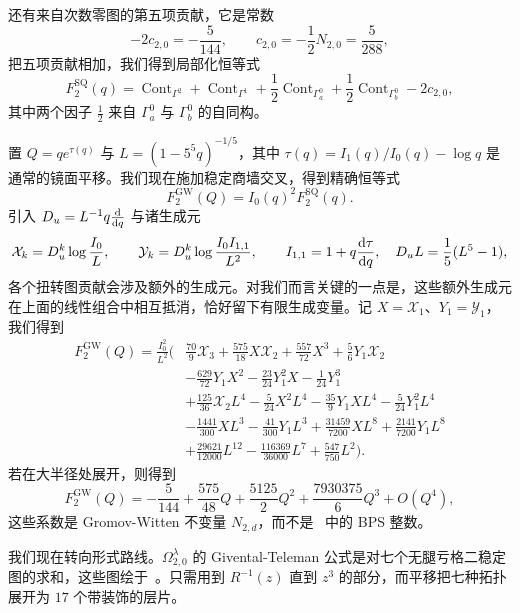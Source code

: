 \documentclass{amsart}
\theoremstyle{definition}
\theoremstyle{remark}
\theoremstyle{plain}
\theoremstyle{definition}
\theoremstyle{remark}
\newcommand{\mc}[1]{\mathcal{#1}}
\newcommand{\mr}[1]{\mathrm{#1}}
\newcommand{\1}{\mathbf{1}}
\newcommand{\2}{\mathbf{2}}
\newcommand{\3}{\mathbf{3}}
\DeclareMathOperator{\Cont}{Cont}
\begin{document}
还有来自次数零图的第五项贡献，它是常数
\[ -2c_{2,0} = -\frac{5}{144}, \qquad c_{2,0} = -\frac{1}{2}N_{2,0} = \frac{5}{288}, \]
把五项贡献相加，我们得到局部化恒等式
\[ F_2^{\mr{SQ}}(q) = \Cont_{\Gamma^2} + \Cont_{\Gamma^1} + \frac{1}{2}\Cont_{\Gamma_a^0} + \frac{1}{2}\Cont_{\Gamma_b^0} - 2c_{2,0}, \]
其中两个因子 \(\frac{1}{2}\) 来自 \(\Gamma_a^0\) 与 \(\Gamma_b^0\) 的自同构。

置 \(Q = qe^{\tau(q)}\) 与 \(L = (1-5^5q)^{-1/5}\)，其中 \(\tau(q) = I_1(q)/I_0(q) - \log q\) 是通常的镜面平移。我们现在施加稳定商墙交叉，得到精确恒等式
\[ F_2^{\mr{GW}}(Q) = I_0(q)^2 F_2^{\mr{SQ}}(q). \]
引入 \(D_u = L^{-1}q\odv{}{q}\) 与诸生成元
\[ \mc{X}_k = D_u^k \log \frac{I_0}{L}, \qquad \mc{Y}_k = D_u^k \log \frac{I_0I_{1,1}}{L^2}, \qquad I_{1,1} = 1 + q \odv{\tau}{q}, \quad D_u L = \frac{1}{5}(L^5-1), \]
各个扭转图贡献会涉及额外的生成元。对我们而言关键的一点是，这些额外生成元在上面的线性组合中相互抵消，恰好留下有限生成变量。记 \(X = \mc{X}_1\)、\(Y_1 = \mc{Y}_1\)，我们得到
\begin{align*}
    F^{\mr{GW}}_2(Q) = \frac{I_0^2}{L^2}\Big(&\frac{70}{9}\mc{X}_3 + \frac{575}{18}X\mc{X}_2 + \frac{557}{72}X^3 + \frac{5}{6}Y_1\mc{X}_2 \\
    &- \frac{629}{72}Y_1X^2 - \frac{23}{24}Y_1^2 X - \frac{1}{24}Y_1^3 \\
    &+ \frac{125}{36}\mc{X}_2 L^4 - \frac{5}{24}X^2L^4 - \frac{35}{9}Y_1XL^4 - \frac{5}{24}Y_1^2L^4 \\
    &- \frac{1441}{300}XL^3 - \frac{41}{300}Y_1L^3 + \frac{31459}{7200}XL^8 + \frac{2141}{7200}Y_1L^8 \\
    &+ \frac{29621}{12000}L^{12} - \frac{116369}{36000}L^7 + \frac{547}{750}L^2\Big).
\end{align*}
若在大半径处展开，则得到
\[ F_2^{\mr{GW}}(Q) = -\frac{5}{144} + \frac{575}{48}Q + \frac{5125}{2}Q^2 + \frac{7930375}{6}Q^3 + O(Q^4), \]
这些系数是 Gromov-Witten 不变量 \(N_{2,d}\)，而不是~ 中的 BPS 整数。

我们现在转向形式路线。\(\Omega^{\lambda}_{2,0}\) 的 Givental-Teleman 公式是对七个无腿亏格二稳定图的求和，这些图绘于~。只需用到 \(R^{-1}(z)\) 直到 \(z^3\) 的部分，而平移把七种拓扑展开为 \(17\) 个带装饰的层片。
\end{document}
